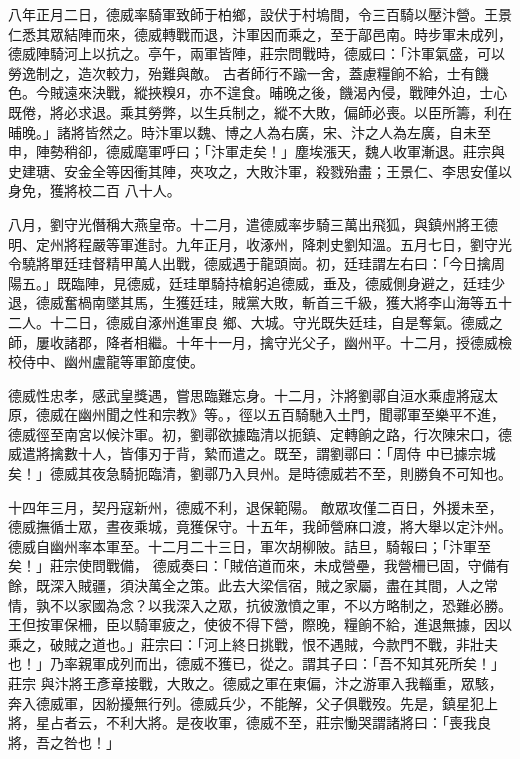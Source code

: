 \begin{pinyinscope}
 八年正月二日，德威率騎軍致師于柏鄉，設伏于村塢間，令三百騎以壓汴營。王景仁悉其眾結陣而來，德威轉戰而退，汴軍因而乘之，至于鄗邑南。時步軍未成列，德威陣騎河上以抗之。亭午，兩軍皆陣，莊宗問戰時，德威曰：「汴軍氣盛，可以勞逸制之，造次較力，殆難與敵。
 古者師行不踰一舍，蓋慮糧餉不給，士有饑色。今賊遠來決戰，縱挾糗Я，亦不遑食。晡晚之後，饑渴內侵，戰陣外迫，士心既倦，將必求退。乘其勞弊，以生兵制之，縱不大敗，偏師必喪。以臣所籌，利在晡晚。」諸將皆然之。時汴軍以魏、博之人為右廣，宋、汴之人為左廣，自未至申，陣勢稍卻，德威麾軍呼曰；「汴軍走矣！」塵埃漲天，魏人收軍漸退。莊宗與史建瑭、安金全等因衝其陣，夾攻之，大敗汴軍，殺戮殆盡；王景仁、李思安僅以身免，獲將校二百
 八十人。



 八月，劉守光僭稱大燕皇帝。十二月，遣德威率步騎三萬出飛狐，與鎮州將王德明、定州將程嚴等軍進討。九年正月，收涿州，降刺史劉知溫。五月七日，劉守光令驍將單廷珪督精甲萬人出戰，德威遇于龍頭崗。初，廷珪謂左右曰：「今日擒周陽五。」既臨陣，見德威，廷珪單騎持槍躬追德威，垂及，德威側身避之，廷珪少退，德威奮楇南墜其馬，生獲廷珪，賊黨大敗，斬首三千級，獲大將李山海等五十二人。十二日，德威自涿州進軍良
 鄉、大城。守光既失廷珪，自是奪氣。德威之師，屢收諸郡，降者相繼。十年十一月，擒守光父子，幽州平。十二月，授德威檢校侍中、幽州盧龍等軍節度使。



 德威性忠孝，感武皇獎遇，嘗思臨難忘身。十二月，汴將劉鄩自洹水乘虛將寇太原，德威在幽州聞之性和宗教》等。，徑以五百騎馳入土門，聞鄩軍至樂平不進，德威徑至南宮以候汴軍。初，劉鄩欲據臨清以扼鎮、定轉餉之路，行次陳宋口，德威遣將擒數十人，皆倳刃于背，縶而遣之。既至，謂劉鄩曰：「周侍
 中已據宗城矣！」德威其夜急騎扼臨清，劉鄩乃入貝州。是時德威若不至，則勝負不可知也。


十四年三月，契丹寇新州，德威不利，退保範陽。
 敵眾攻僅二百日，外援未至，德威撫循士眾，晝夜乘城，竟獲保守。十五年，我師營麻口渡，將大舉以定汴州。德威自幽州率本軍至。十二月二十三日，軍次胡柳陂。詰旦，騎報曰；「汴軍至矣！」莊宗使問戰備，
 德威奏曰：「賊倍道而來，未成營壘，我營柵已固，守備有餘，既深入賊疆，須決萬全之策。此去大梁信宿，賊之家屬，盡在其間，人之常情，孰不以家國為念？以我深入之眾，抗彼激憤之軍，不以方略制之，恐難必勝。王但按軍保柵，臣以騎軍疲之，使彼不得下營，際晚，糧餉不給，進退無據，因以乘之，破賊之道也。」莊宗曰：「河上終日挑戰，恨不遇賊，今款門不戰，非壯夫也！」乃率親軍成列而出，德威不獲已，從之。謂其子曰：「吾不知其死所矣！」莊宗
 與汴將王彥章接戰，大敗之。德威之軍在東偏，汴之游軍入我輜重，眾駭，奔入德威軍，因紛擾無行列。德威兵少，不能解，父子俱戰歿。先是，鎮星犯上將，星占者云，不利大將。是夜收軍，德威不至，莊宗慟哭謂諸將曰：「喪我良將，吾之咎也！」




\end{pinyinscope}
